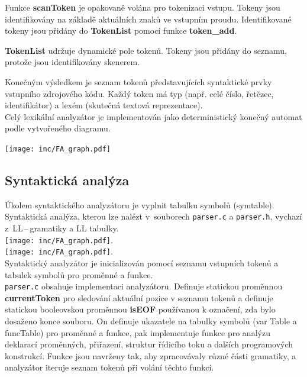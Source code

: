 \documentclass[a4paper, 11pt]{article}
\begin{document}
        Funkce \textbf{scanToken} je opakovaně volána pro tokenizaci vstupu.
        Tokeny jsou identifikovány na základě aktuálních znaků ve vstupním proudu.
        Identifikované tokeny jsou přidány do \textbf{TokenList} pomocí funkce \textbf{token\_add}.
        
        \textbf{TokenList} udržuje dynamické pole tokenů.
        Tokeny jsou přidány do seznamu, protože jsou identifikovány skenerem.
        
        Konečným výsledkem je seznam tokenů představujících syntaktické prvky vstupního zdrojového kódu.
        Každý token má typ (např. celé číslo, řetězec, identifikátor) a lexém (skutečná textová reprezentace).
        \\

	Celý lexikální analyzátor je implementován jako deterministický konečný automat podle vytvořeného diagramu.

 \texttt{[image: inc/FA\_graph.pdf]}

	\subsection{Syntaktická analýza}

        Úkolem syntaktického analyzátoru je vyplnit tabulku symbolů (symtable). Syntaktická analýza, kterou lze nalézt v~souborech \verb|parser.c| a \verb|parser.h|, vychazí z~LL\,--\,gramatiky a LL tabulky. 
        \\
        \texttt{[image: inc/FA\_graph.pdf]}. 
        \\
        \texttt{[image: inc/FA\_graph.pdf]}. 
        \\



Syntaktický analyzátor je inicializován pomocí seznamu vstupních tokenů a tabulek symbolů pro proměnné a funkce.\\
\verb|parser.c| obsahuje implementaci analyzátoru.
Definuje statickou proměnnou \textbf{currentToken} pro sledování aktuální pozice v seznamu tokenů a definuje statickou booleovskou proměnnou \textbf{isEOF} používanou k označení, zda bylo dosaženo konce souboru.
On definuje ukazatele na tabulky symbolů (var Table a funcTable) pro proměnné a funkce, pak
implementuje funkce pro analýzu deklarací proměnných, přiřazení, struktur řídicího toku a dalších programových konstrukcí.
Funkce jsou navrženy tak, aby zpracovávaly různé části gramatiky, a analyzátor iteruje seznam tokenů při volání těchto funkcí.\\
\end{document}
